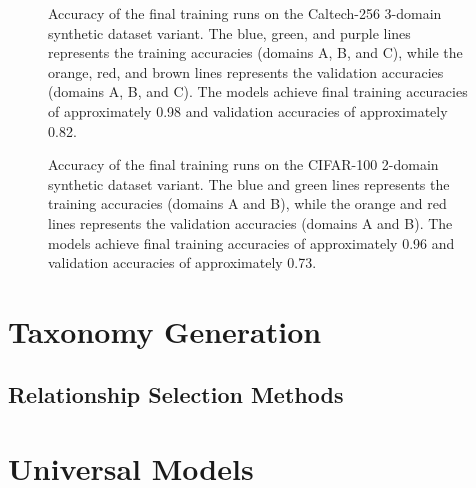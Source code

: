 \begin{figure}[ht]
      \centering
      \scalebox{0.6}{}
      \caption{Accuracy of the final training runs on the Caltech-256 3-domain synthetic dataset variant.
            The blue, green, and purple lines represents the training accuracies (domains A, B, and C),
            while the orange, red, and brown lines represents the validation accuracies (domains A, B, and C).
            The models achieve final training accuracies of approximately 0.98 and validation accuracies of approximately 0.82.}
      \label{fig:caltech256_3domain_accuracy}
\end{figure}

\begin{figure}[ht]
      \centering
      \scalebox{0.6}{}
      \caption{Accuracy of the final training runs on the CIFAR-100 2-domain synthetic dataset variant.
            The blue and green lines represents the training accuracies (domains A and B),
            while the orange and red lines represents the validation accuracies (domains A and B).
            The models achieve final training accuracies of approximately 0.96 and validation accuracies of approximately 0.73.}
      \label{fig:cifar100_2domain_accuracy}
\end{figure}





\section{Taxonomy Generation}

\subsection{Relationship Selection Methods} \label{sec:relationship_selection}



\section{Universal Models}

